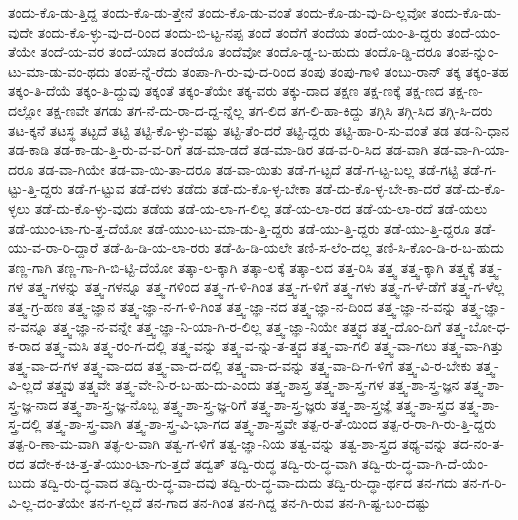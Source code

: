 {ತಂದು-ಕೊ-ಡು-ತ್ತಿದ್ದ
ತಂದು-ಕೊ-ಡು-ತ್ತೇನೆ
ತಂದು-ಕೊ-ಡು-ವಂತೆ
ತಂದು-ಕೊ-ಡು-ವು-ದಿ-ಲ್ಲವೋ
ತಂದು-ಕೊ-ಡು-ವುದೇ
ತಂದು-ಕೊ-ಳ್ಳು-ವು-ದ-ರಿಂದ
ತಂದು-ಬಿ-ಟ್ಟ-ನಪ್ಪ
ತಂದೆ
ತಂದೆಗೆ
ತಂದೆಯ
ತಂದೆ-ಯಂ-ತಿ-ದ್ದರು
ತಂದೆ-ಯಂ-ತೆಯೇ
ತಂದೆ-ಯ-ವರ
ತಂದೆ-ಯಾದ
ತಂದೆಯೊ
ತಂದೆವೋ
ತಂದೊ-ಡ್ಡ-ಬ-ಹುದು
ತಂದೊ-ಡ್ಡಿ-ದರೂ
ತಂಪ-ನ್ನುಂ-ಟು-ಮಾ-ಡು-ವಂ-ಥದು
ತಂಪ-ನ್ನೆ-ರೆದು
ತಂಪಾ-ಗಿ-ರು-ವು-ದ-ರಿಂದ
ತಂಪು
ತಂಪು-ಗಾಳಿ
ತಂಬು-ರಾನ್
ತಕ್ಕ
ತಕ್ಕಂ-ತಹ
ತಕ್ಕಂ-ತಿ-ದೆಯೆ
ತಕ್ಕಂ-ತಿ-ದ್ದುವು
ತಕ್ಕಂತೆ
ತಕ್ಕಂ-ತೆಯೇ
ತಕ್ಕ-ವರು
ತಕ್ಕು-ದಾದ
ತಕ್ಷಣ
ತಕ್ಷ-ಣಕ್ಕೆ
ತಕ್ಷ-ಣದ
ತಕ್ಷ-ಣ-ದಲ್ಲೋ
ತಕ್ಷ-ಣವೇ
ತಗಡು
ತಗ-ನೆ-ದು-ರಾ-ದ-ದ್ದ-ನ್ನೆಲ್ಲ
ತಗ-ಲಿದ
ತಗ-ಲಿ-ಹಾ-ಕಿದ್ದು
ತಗ್ಗಿಸಿ
ತಗ್ಗಿ-ಸಿದ
ತಗ್ಗಿ-ಸಿ-ದರು
ತಟ-ಕ್ಕನೆ
ತಟಸ್ಥ
ತಟ್ಟದೆ
ತಟ್ಟಿ
ತಟ್ಟಿ-ಕೊ-ಳ್ಳು-ವಷ್ಟು
ತಟ್ಟಿ-ತೆಂ-ದರೆ
ತಟ್ಟಿ-ದ್ದರು
ತಟ್ಟಿ-ಹಾ-ರಿ-ಸು-ವಂತೆ
ತಡ
ತಡ-ನಿ-ಧಾನ
ತಡ-ಕಾಡಿ
ತಡ-ಕಾ-ಡು-ತ್ತಿ-ರು-ವ-ವ-ರಿಗೆ
ತಡ-ಮಾ-ಡದೆ
ತಡ-ಮಾ-ಡಿರ
ತಡ-ವ-ರಿ-ಸಿದ
ತಡ-ವಾಗಿ
ತಡ-ವಾ-ಗಿ-ಯಾ-ದರೂ
ತಡ-ವಾ-ಗಿಯೇ
ತಡ-ವಾ-ಯಿ-ತಾ-ದರೂ
ತಡ-ವಾ-ಯಿತು
ತಡೆ-ಗ-ಟ್ಟದೆ
ತಡೆ-ಗ-ಟ್ಟ-ಬಲ್ಲ
ತಡೆ-ಗಟ್ಟಿ
ತಡೆ-ಗ-ಟ್ಟು-ತ್ತಿ-ದ್ದರು
ತಡೆ-ಗ-ಟ್ಟುವ
ತಡೆ-ದಳು
ತಡೆದು
ತಡೆ-ದು-ಕೊ-ಳ್ಳ-ಬೇಕಾ
ತಡೆ-ದು-ಕೊ-ಳ್ಳ-ಬೇ-ಕಾ-ದರೆ
ತಡೆ-ದು-ಕೊ-ಳ್ಳಲು
ತಡೆ-ದು-ಕೊ-ಳ್ಳು-ವುದು
ತಡೆಯ
ತಡೆ-ಯ-ಲಾ-ಗ-ಲಿಲ್ಲ
ತಡೆ-ಯ-ಲಾ-ರದ
ತಡೆ-ಯ-ಲಾ-ರದೆ
ತಡೆ-ಯಲು
ತಡೆ-ಯುಂ-ಟಾ-ಗು-ತ್ತ-ದೆಯೋ
ತಡೆ-ಯುಂ-ಟು-ಮಾ-ಡು-ತ್ತಿ-ದ್ದರು
ತಡೆ-ಯು-ತ್ತಿ-ದ್ದರು
ತಡೆ-ಯು-ತ್ತಿ-ದ್ದರೂ
ತಡೆ-ಯು-ವ-ರಾ-ರಿ-ದ್ದಾರೆ
ತಡೆ-ಹಿ-ಡಿ-ಯ-ಲಾ-ರರು
ತಡೆ-ಹಿ-ಡಿ-ಯಲೇ
ತಣಿ-ಸ-ಲೆಂ-ದಲ್ಲ
ತಣಿ-ಸಿ-ಕೊಂ-ಡಿ-ರ-ಬ-ಹುದು
ತಣ್ಣ-ಗಾಗಿ
ತಣ್ಣ-ಗಾ-ಗಿ-ಬಿ-ಟ್ಟಿ-ದೆಯೋ
ತತ್ಕಾ-ಲ-ಕ್ಕಾಗಿ
ತತ್ಕಾ-ಲಕ್ಕೆ
ತತ್ಕಾ-ಲದ
ತತ್ತ-ರಿಸಿ
ತತ್ತ್ವ
ತತ್ತ್ವ-ಕ್ಕಾಗಿ
ತತ್ತ್ವಕ್ಕೆ
ತತ್ತ್ವ-ಗಳ
ತತ್ತ್ವ-ಗಳನ್ನು
ತತ್ತ್ವ-ಗಳನ್ನೂ
ತತ್ತ್ವ-ಗಳಿಂದ
ತತ್ತ್ವ-ಗ-ಳಿ-ಗಿಂತ
ತತ್ತ್ವ-ಗ-ಳಿಗೆ
ತತ್ತ್ವ-ಗಳು
ತತ್ತ್ವ-ಗ-ಳೆ-ಡೆಗೆ
ತತ್ತ್ವ-ಗ-ಳೆಲ್ಲ
ತತ್ತ್ವ-ಗ್ರ-ಹಣ
ತತ್ತ್ವ-ಜ್ಞಾನ
ತತ್ತ್ವ-ಜ್ಞಾ-ನ-ಗ-ಳಿ-ಗಿಂತ
ತತ್ತ್ವ-ಜ್ಞಾ-ನದ
ತತ್ತ್ವ-ಜ್ಞಾ-ನ-ದಿಂದ
ತತ್ತ್ವ-ಜ್ಞಾ-ನ-ವನ್ನು
ತತ್ತ್ವ-ಜ್ಞಾ-ನ-ವನ್ನೂ
ತತ್ತ್ವ-ಜ್ಞಾ-ನ-ವನ್ನೇ
ತತ್ತ್ವ-ಜ್ಞಾ-ನಿ-ಯಾ-ಗಿ-ರ-ಲಿಲ್ಲ
ತತ್ತ್ವ-ಜ್ಞಾ-ನಿಯೇ
ತತ್ತ್ವದ
ತತ್ತ್ವ-ದೊಂ-ದಿಗೆ
ತತ್ತ್ವ-ಬೋ-ಧ-ಕ-ರಾದ
ತತ್ತ್ವ-ಮಸಿ
ತತ್ತ್ವ-ರಂ-ಗ-ದಲ್ಲಿ
ತತ್ತ್ವ-ವನ್ನು
ತತ್ತ್ವ-ವ-ನ್ನು-ತ-ತ್ತ್ವದ
ತತ್ತ್ವ-ವಾ-ಗಲಿ
ತತ್ತ್ವ-ವಾ-ಗಲು
ತತ್ತ್ವ-ವಾ-ಗಿತ್ತು
ತತ್ತ್ವ-ವಾ-ದ-ಗಳ
ತತ್ತ್ವ-ವಾ-ದದ
ತತ್ತ್ವ-ವಾ-ದ-ದಲ್ಲಿ
ತತ್ತ್ವ-ವಾ-ದ-ವನ್ನು
ತತ್ತ್ವ-ವಾ-ದಿ-ಗ-ಳಿಗೆ
ತತ್ತ್ವ-ವಿ-ರ-ಬೇಕು
ತತ್ತ್ವ-ವಿ-ಲ್ಲದೆ
ತತ್ತ್ವವು
ತತ್ತ್ವವೇ
ತತ್ತ್ವ-ವೇ-ನಿ-ರ-ಬ-ಹು-ದು-ಎಂದು
ತತ್ತ್ವ-ಶಾಸ್ತ್ರ
ತತ್ತ್ವ-ಶಾ-ಸ್ತ್ರ-ಗಳ
ತತ್ತ್ವ-ಶಾ-ಸ್ತ್ರ-ಜ್ಞನ
ತತ್ತ್ವ-ಶಾ-ಸ್ತ್ರ-ಜ್ಞ-ನಾದ
ತತ್ತ್ವ-ಶಾ-ಸ್ತ್ರ-ಜ್ಞ-ನೊಬ್ಬ
ತತ್ತ್ವ-ಶಾ-ಸ್ತ್ರ-ಜ್ಞ-ರಿಗೆ
ತತ್ತ್ವ-ಶಾ-ಸ್ತ್ರ-ಜ್ಞರು
ತತ್ತ್ವ-ಶಾ-ಸ್ತ್ರಜ್ಞೆ
ತತ್ತ್ವ-ಶಾ-ಸ್ತ್ರದ
ತತ್ತ್ವ-ಶಾ-ಸ್ತ್ರ-ದಲ್ಲಿ
ತತ್ತ್ವ-ಶಾ-ಸ್ತ್ರ-ವಾಗಿ
ತತ್ತ್ವ-ಶಾ-ಸ್ತ್ರ-ವಿ-ಭಾ-ಗದ
ತತ್ತ್ವ-ಶಾ-ಸ್ತ್ರವೇ
ತತ್ಪ-ರ-ತೆ-ಯಿಂದ
ತತ್ಪ-ರ-ರಾ-ಗಿ-ರು-ತ್ತಿ-ದ್ದರು
ತತ್ಪ-ರಿ-ಣಾ-ಮ-ವಾಗಿ
ತತ್ಫ-ಲ-ವಾಗಿ
ತತ್ವ-ಗ-ಳಿಗೆ
ತತ್ವ-ಜ್ಞಾ-ನಿಯ
ತತ್ವ-ವನ್ನು
ತತ್ವ-ಶಾ-ಸ್ತ್ರದ
ತಥ್ಯ-ವನ್ನು
ತದ-ನಂ-ತ-ರದ
ತದೇ-ಕ-ಚಿ-ತ್ತ-ತೆ-ಯುಂ-ಟಾ-ಗು-ತ್ತದೆ
ತದ್ವತ್
ತದ್ವಿ-ರುದ್ಧ
ತದ್ವಿ-ರು-ದ್ಧ-ವಾಗಿ
ತದ್ವಿ-ರು-ದ್ಧ-ವಾ-ಗಿ-ದೆ-ಯೆಂ-ಬುದು
ತದ್ವಿ-ರು-ದ್ಧ-ವಾದ
ತದ್ವಿ-ರು-ದ್ಧ-ವಾ-ದವು
ತದ್ವಿ-ರು-ದ್ಧ-ವಾ-ದುದು
ತದ್ವಿ-ರು-ದ್ಧಾ-ರ್ಥದ
ತನ-ಗದು
ತನ-ಗ-ರಿ-ವಿ-ಲ್ಲ-ದಂ-ತೆಯೇ
ತನ-ಗ-ಲ್ಲದೆ
ತನ-ಗಾದ
ತನ-ಗಿಂತ
ತನ-ಗಿದ್ದ
ತನ-ಗಿ-ರುವ
ತನ-ಗಿ-ಷ್ಟ-ಬಂ-ದಷ್ಟು
}
